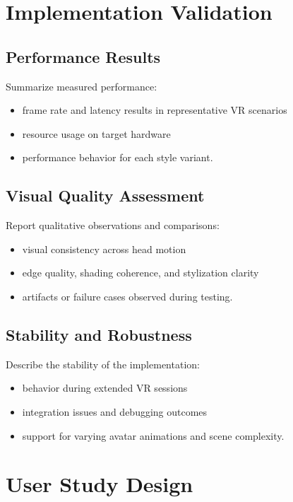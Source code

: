 \section{Implementation Validation}
\label{sec:implementation_validation}

\subsection{Performance Results}

Summarize measured performance:
\begin{itemize}
  \item frame rate and latency results in representative VR scenarios
  \item resource usage on target hardware
  \item performance behavior for each style variant.
\end{itemize}

\subsection{Visual Quality Assessment}

Report qualitative observations and comparisons:
\begin{itemize}
  \item visual consistency across head motion
  \item edge quality, shading coherence, and stylization clarity
  \item artifacts or failure cases observed during testing.
\end{itemize}

\subsection{Stability and Robustness}

Describe the stability of the implementation:
\begin{itemize}
  \item behavior during extended VR sessions
  \item integration issues and debugging outcomes
  \item support for varying avatar animations and scene complexity.
\end{itemize}

\section{User Study Design}
\label{sec:user_study_design}

